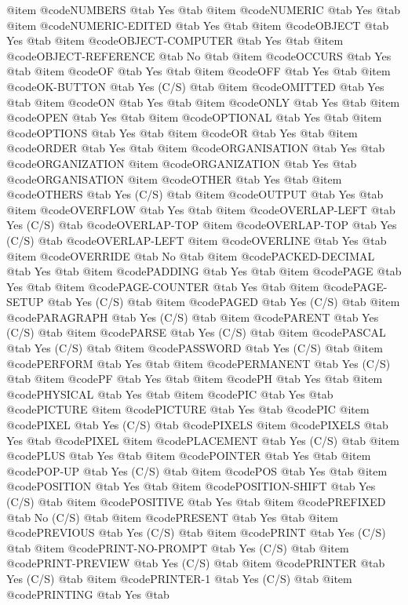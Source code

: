 @item @code{NUMBERS} @tab Yes @tab 
@item @code{NUMERIC} @tab Yes @tab 
@item @code{NUMERIC-EDITED} @tab Yes @tab 
@item @code{OBJECT} @tab Yes @tab 
@item @code{OBJECT-COMPUTER} @tab Yes @tab 
@item @code{OBJECT-REFERENCE} @tab No @tab 
@item @code{OCCURS} @tab Yes @tab 
@item @code{OF} @tab Yes @tab 
@item @code{OFF} @tab Yes @tab 
@item @code{OK-BUTTON} @tab Yes	(C/S) @tab 
@item @code{OMITTED} @tab Yes @tab 
@item @code{ON} @tab Yes @tab 
@item @code{ONLY} @tab Yes @tab 
@item @code{OPEN} @tab Yes @tab 
@item @code{OPTIONAL} @tab Yes @tab 
@item @code{OPTIONS} @tab Yes @tab 
@item @code{OR} @tab Yes @tab 
@item @code{ORDER} @tab Yes @tab 
@item @code{ORGANISATION} @tab Yes @tab @code{ORGANIZATION}
@item @code{ORGANIZATION} @tab Yes @tab @code{ORGANISATION}
@item @code{OTHER} @tab Yes @tab 
@item @code{OTHERS} @tab Yes	(C/S) @tab 
@item @code{OUTPUT} @tab Yes @tab 
@item @code{OVERFLOW} @tab Yes @tab 
@item @code{OVERLAP-LEFT} @tab Yes	(C/S) @tab @code{OVERLAP-TOP}
@item @code{OVERLAP-TOP} @tab Yes	(C/S) @tab @code{OVERLAP-LEFT}
@item @code{OVERLINE} @tab Yes @tab 
@item @code{OVERRIDE} @tab No @tab 
@item @code{PACKED-DECIMAL} @tab Yes @tab 
@item @code{PADDING} @tab Yes @tab 
@item @code{PAGE} @tab Yes @tab 
@item @code{PAGE-COUNTER} @tab Yes @tab 
@item @code{PAGE-SETUP} @tab Yes	(C/S) @tab 
@item @code{PAGED} @tab Yes	(C/S) @tab 
@item @code{PARAGRAPH} @tab Yes	(C/S) @tab 
@item @code{PARENT} @tab Yes	(C/S) @tab 
@item @code{PARSE} @tab Yes	(C/S) @tab 
@item @code{PASCAL} @tab Yes	(C/S) @tab 
@item @code{PASSWORD} @tab Yes	(C/S) @tab 
@item @code{PERFORM} @tab Yes @tab 
@item @code{PERMANENT} @tab Yes	(C/S) @tab 
@item @code{PF} @tab Yes @tab 
@item @code{PH} @tab Yes @tab 
@item @code{PHYSICAL} @tab Yes @tab 
@item @code{PIC} @tab Yes @tab @code{PICTURE}
@item @code{PICTURE} @tab Yes @tab @code{PIC}
@item @code{PIXEL} @tab Yes	(C/S) @tab @code{PIXELS}
@item @code{PIXELS} @tab Yes @tab @code{PIXEL}
@item @code{PLACEMENT} @tab Yes	(C/S) @tab 
@item @code{PLUS} @tab Yes @tab 
@item @code{POINTER} @tab Yes @tab 
@item @code{POP-UP} @tab Yes	(C/S) @tab 
@item @code{POS} @tab Yes @tab 
@item @code{POSITION} @tab Yes @tab 
@item @code{POSITION-SHIFT} @tab Yes	(C/S) @tab 
@item @code{POSITIVE} @tab Yes @tab 
@item @code{PREFIXED} @tab No	(C/S) @tab 
@item @code{PRESENT} @tab Yes @tab 
@item @code{PREVIOUS} @tab Yes	(C/S) @tab 
@item @code{PRINT} @tab Yes	(C/S) @tab 
@item @code{PRINT-NO-PROMPT} @tab Yes	(C/S) @tab 
@item @code{PRINT-PREVIEW} @tab Yes	(C/S) @tab 
@item @code{PRINTER} @tab Yes	(C/S) @tab 
@item @code{PRINTER-1} @tab Yes	(C/S) @tab 
@item @code{PRINTING} @tab Yes @tab 
